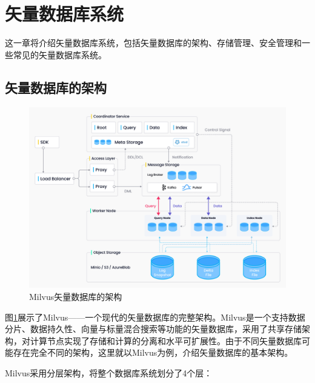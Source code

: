 \section{矢量数据库系统}

这一章将介绍矢量数据库系统，包括矢量数据库的架构、存储管理、安全管理和一些常见的矢量数据库系统。

\subsection{矢量数据库的架构}

\begin{figure}[H]
    \includegraphics[width=\textwidth]{examples/arch.png}
    \centering
    \caption{Milvus矢量数据库的架构}
    \label{fig:arch}
\end{figure}

图\ref{fig:arch}展示了Milvus\cite{2021milvus}——一个现代的矢量数据库的完整架构。Milvus是一个支持数据分片、数据持久性、向量与标量混合搜索等功能的矢量数据库，采用了共享存储架构，对计算节点实现了存储和计算的分离和水平可扩展性。由于不同矢量数据库可能存在完全不同的架构，这里就以Milvus为例，介绍矢量数据库的基本架构。

Milvus采用分层架构，将整个数据库系统划分了4个层：

